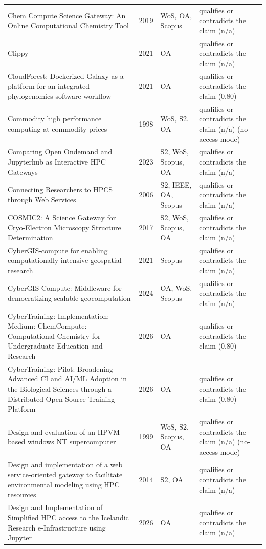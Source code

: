 \begin{longtable}{@{}%
  >{\raggedright\arraybackslash}p{}c%
  >{\raggedright\arraybackslash}p{}%
  >{\raggedright\arraybackslash}p{}@{}}
Chem Compute Science Gateway: An Online Computational Chemistry Tool & 2019 & WoS, OA, Scopus & qualifies or contradicts the claim (n/a) \\
Clippy & 2021 & OA & qualifies or contradicts the claim (n/a) \\
CloudForest: Dockerized Galaxy as a platform for an integrated phylogenomics software workflow & 2021 & OA & qualifies or contradicts the claim (0.80) \\
Commodity high performance computing at commodity prices & 1998 & WoS, S2, OA & qualifies or contradicts the claim (n/a) (no-access-mode) \\
Comparing Open Ondemand and Jupyterhub as Interactive HPC Gateways & 2023 & S2, WoS, Scopus, OA & qualifies or contradicts the claim (n/a) \\
Connecting Researchers to HPCS through Web Services & 2006 & S2, IEEE, OA, Scopus & qualifies or contradicts the claim (n/a) \\
COSMIC2: A Science Gateway for Cryo-Electron Microscopy Structure Determination & 2017 & S2, WoS, Scopus, OA & qualifies or contradicts the claim (n/a) \\
CyberGIS-compute for enabling computationally intensive geospatial research & 2021 & Scopus & qualifies or contradicts the claim (n/a) \\
CyberGIS-Compute: Middleware for democratizing scalable geocomputation & 2024 & OA, WoS, Scopus & qualifies or contradicts the claim (n/a) \\
CyberTraining: Implementation: Medium: ChemCompute: Computational Chemistry for Undergraduate Education and Research & 2026 & OA & qualifies or contradicts the claim (0.80) \\
CyberTraining: Pilot: Broadening Advanced CI and AI/ML Adoption in the Biological Sciences through a Distributed Open-Source Training Platform & 2026 & OA & qualifies or contradicts the claim (0.80) \\
Design and evaluation of an HPVM-based windows NT supercomputer & 1999 & WoS, S2, Scopus, OA & qualifies or contradicts the claim (n/a) (no-access-mode) \\
Design and implementation of a web service-oriented gateway to facilitate environmental modeling using HPC resources & 2014 & S2, OA & qualifies or contradicts the claim (n/a) \\
Design and Implementation of Simplified HPC access to the Icelandic Research e-Infrastructure using Jupyter & 2026 & OA & qualifies or contradicts the claim (n/a) \\

\end{longtable}
